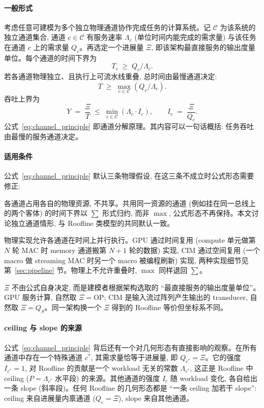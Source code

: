 \paragraph{一般形式}
考虑任意可建模为多个独立物理通道协作完成任务的计算系统。记 $\mathcal{C}$ 为该系统的独立通道集合, 通道 $c \in \mathcal{C}$ 有服务速率 $\Lambda_c$ (单位时间内能完成的需求量) 与该任务在通道 $c$ 上的需求量 $Q_c$。再选定一个进展量 $\Xi$, 即该架构最直接服务的输出度量单位。每个通道的时间下界为
\[
T_c \;\ge\; Q_c / \Lambda_c.
\]
若各通道物理独立、且执行上可流水线重叠, 总时间由最慢通道决定:
\[
T \;\ge\; \max_{c \in \mathcal{C}} (Q_c / \Lambda_c).
\]
吞吐上界为
\begin{equation}
\boxed{\ Y \;=\; \frac{\Xi}{T} \;\le\; \min_{c \in \mathcal{C}} (\Lambda_c \cdot I_c), \qquad I_c \;=\; \frac{\Xi}{Q_c}.\ }
\label{eq:channel_principle}
\end{equation}
公式~\eqref{eq:channel_principle} 即通道分解原理。其内容可以一句话概括: 任务吞吐由最慢的服务通道决定。

\paragraph{适用条件}
公式~\eqref{eq:channel_principle} 默认三条物理假设, 在这三条不成立时公式形态需要修正:

\begin{description}[leftmargin=*, itemsep=4pt]
    \item[\textbf{通道物理独立}:] 各通道占用各自的物理资源, 不共享。共用同一资源的通道 (例如挂在同一总线上的两个客体) 的时间下界以 $\sum$ 形式归约, 而非 $\max$, 公式形态不再保持。本文讨论独立通道情形, 与 Roofline 类模型的共同默认一致。
    \item[\textbf{可流水线重叠}:] 物理实现允许各通道在时间上并行执行。GPU 通过时间复用 (compute 单元做第 $N$ 轮 MAC 时 memory 通道搬第 $N+1$ 轮的数据) 实现, CIM 通过空间复用 (一个 macro 做 streaming MAC 时另一个 macro 被编程刷新) 实现, 两种实现细节见第~\ref{sec:pipeline} 节。物理上不允许重叠时, $\max$ 同样退回 $\sum$。
    \item[\textbf{进展量 $\Xi$ 是建模选择}:] $\Xi$ 不由公式自身决定, 而是建模者根据架构选取的 “最直接服务的输出度量单位”。GPU 服务计算, 自然取 $\Xi = \mathrm{OP}$; CIM 是输入流过阵列产生输出的 transducer, 自然取 $\Xi = Q_S$。同一架构换一个 $\Xi$ 得到的 Roofline 等价但坐标系不同。
\end{description}

\paragraph{ceiling 与 slope 的来源}
公式~\eqref{eq:channel_principle} 背后还有一个对几何形态有直接影响的观察。在所有通道中存在一个特殊通道 $c^{*}$, 其需求量恰等于进展量, 即 $Q_{c^{*}} = \Xi$。它的强度 $I_{c^{*}} = 1$, 对 Roofline 的贡献是一个 workload 无关的常数 $\Lambda_{c^{*}}$, 这正是 Roofline 中 ceiling ($P = \Lambda_{c^{*}}$ 水平段) 的来源。其他通道的强度 $I_c$ 随 workload 变化, 各自给出一条 slope (斜率段)。任何 Roofline 的几何形态都是 “一条 ceiling 加若干 slope”: ceiling 来自进展量内禀通道 ($Q_c = \Xi$), slope 来自其他通道。

